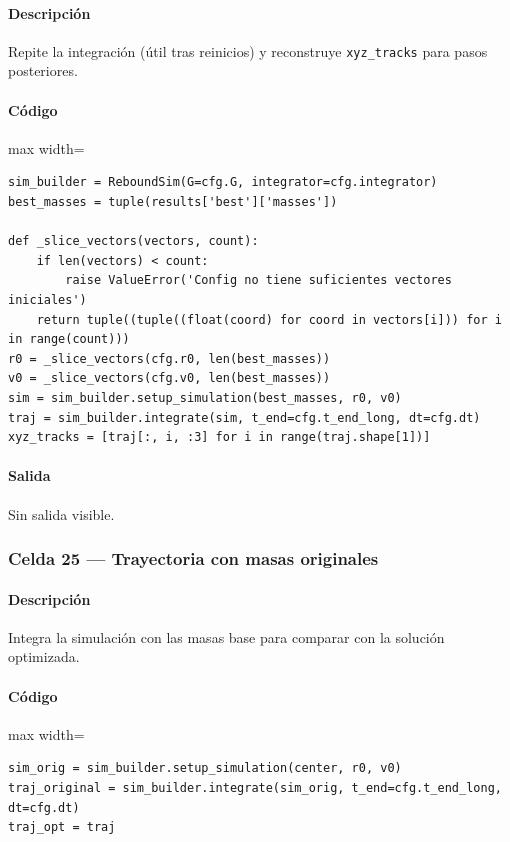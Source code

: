 \paragraph{Descripción} Repite la integración (útil tras reinicios) y reconstruye \texttt{xyz\_tracks} para pasos posteriores.
\paragraph{Código}
\begin{listing}[H]
\caption{Celda 24: regeneración de trayectorias}
\begin{adjustbox}{max width=\textwidth}
\begin{minipage}{\textwidth}
\begin{verbatim}
sim_builder = ReboundSim(G=cfg.G, integrator=cfg.integrator)
best_masses = tuple(results['best']['masses'])

def _slice_vectors(vectors, count):
    if len(vectors) < count:
        raise ValueError('Config no tiene suficientes vectores iniciales')
    return tuple((tuple((float(coord) for coord in vectors[i])) for i in range(count)))
r0 = _slice_vectors(cfg.r0, len(best_masses))
v0 = _slice_vectors(cfg.v0, len(best_masses))
sim = sim_builder.setup_simulation(best_masses, r0, v0)
traj = sim_builder.integrate(sim, t_end=cfg.t_end_long, dt=cfg.dt)
xyz_tracks = [traj[:, i, :3] for i in range(traj.shape[1])]
\end{verbatim}
\end{minipage}
\end{adjustbox}
\end{listing}
\paragraph{Salida} Sin salida visible.

\subsubsection*{Celda 25 — Trayectoria con masas originales}
\paragraph{Descripción} Integra la simulación con las masas base para comparar con la solución optimizada.
\paragraph{Código}
\begin{listing}[H]
\caption{Celda 25: trayectoria baseline}
\begin{adjustbox}{max width=\textwidth}
\begin{minipage}{\textwidth}
\begin{verbatim}
sim_orig = sim_builder.setup_simulation(center, r0, v0)
traj_original = sim_builder.integrate(sim_orig, t_end=cfg.t_end_long, dt=cfg.dt)
traj_opt = traj
\end{verbatim}
\end{minipage}
\end{adjustbox}
\end{listing}
